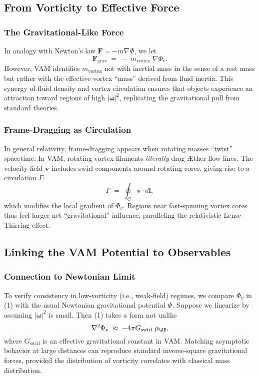 \documentclass[aps,preprint,superscriptaddress]{revtex4-2}
\begin{document}
    \subsection{From Vorticity to Effective Force}
    \subsubsection{The Gravitational-Like Force}

    In analogy with Newton’s law \(\mathbf{F} = -m \nabla \Phi\), we let
    \[
        \mathbf{F}_{\mathrm{grav}} \;=\; -\,m_{\mathrm{vortex}}\;\nabla \Phi_v.
    \]
    However, VAM identifies \(m_{\mathrm{vortex}}\) not with inertial mass in the sense of a rest mass but rather with the effective vortex “mass” derived from fluid inertia. This synergy of fluid density and vortex circulation ensures that objects experience an attraction toward regions of high \(\lvert \boldsymbol{\omega} \rvert^2\), replicating the gravitational pull from standard theories.

    \subsubsection{Frame-Dragging as Circulation}

    In general relativity, frame-dragging appears when rotating masses “twist” spacetime. In VAM, rotating vortex filaments \textit{literally} drag Æther flow lines. The velocity field \(\mathbf{v}\) includes swirl components around rotating cores, giving rise to a circulation \(\Gamma\):
    \[
        \Gamma \;=\; \oint_C \mathbf{v}\cdot d\mathbf{l},
    \]
    which modifies the local gradient of \(\Phi_v\). Regions near fast-spinning vortex cores thus feel larger net “gravitational” influence, paralleling the relativistic Lense–Thirring effect.

    \subsection{Linking the VAM Potential to Observables}

    \subsubsection{Connection to Newtonian Limit}

    To verify consistency in low-vorticity (i.e., weak-field) regimes, we compare \(\Phi_v\) in (1) with the usual Newtonian gravitational potential \(\Phi\). Suppose we linearize by assuming \(\lvert \boldsymbol{\omega} \rvert^2\) is small. Then (1) takes a form not unlike
    \[
        \nabla^2 \Phi_v \;\approx\; -4\pi G_{\mathrm{swirl}}\;\rho_{\mathrm{\AE}},
    \]
    where \(G_{\mathrm{swirl}}\) is an effective gravitational constant in VAM. Matching asymptotic behavior at large distances can reproduce standard inverse-square gravitational forces, provided the distribution of vorticity correlates with classical mass distribution.
\end{document}
